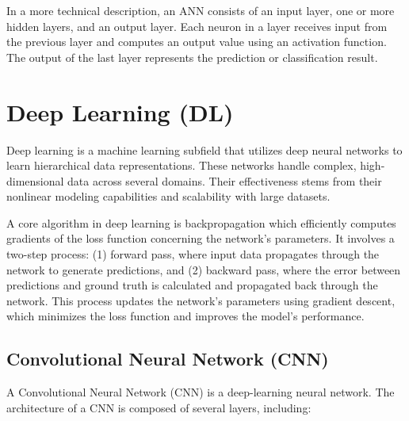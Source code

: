 



In a more technical description, an ANN consists of an input layer, one or more hidden layers, and an output layer. Each neuron in a layer receives input from the previous layer and computes an output value using an activation function. The output of the last layer represents the prediction or classification result.





\section{Deep Learning (DL)}

Deep learning is a machine learning subfield that utilizes deep neural networks to learn hierarchical data representations. These networks handle complex, high-dimensional data across several domains. Their effectiveness stems from their nonlinear modeling capabilities and scalability with large datasets.

A core algorithm in deep learning is backpropagation which efficiently computes gradients of the loss function concerning the network's parameters. It involves a two-step process: (1) forward pass, where input data propagates through the network to generate predictions, and (2) backward pass, where the error between predictions and ground truth is calculated and propagated back through the network. This process updates the network's parameters using gradient descent, which minimizes the loss function and improves the model's performance.



\subsection{Convolutional Neural Network (CNN)}

A Convolutional Neural Network (CNN) is a deep-learning neural network. The architecture of a CNN is composed of several layers, including:

